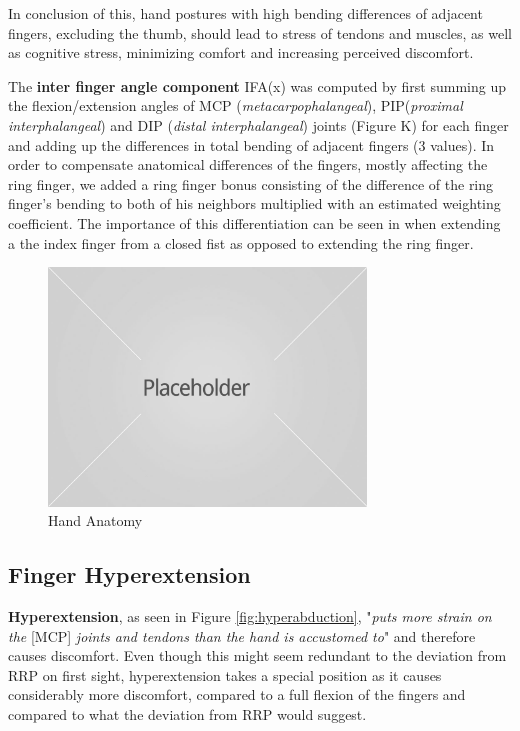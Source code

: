 \documentclass{sig-alternate-05-2015}
\begin{document}
In conclusion of this, hand postures with high bending differences of adjacent fingers, excluding the thumb, should lead to stress of tendons and muscles, as well as cognitive stress, minimizing comfort and increasing perceived discomfort.

The \textbf{inter finger angle component} IFA(x) was computed by first summing up the flexion/extension angles of MCP (\textit{metacarpophalangeal}), PIP(\textit{proximal interphalangeal}) and DIP (\textit{distal interphalangeal}) joints (Figure K) for each finger and adding up the differences in total bending of adjacent fingers (3 values). In order to compensate anatomical differences of the fingers, mostly affecting the ring finger, we added a ring finger bonus consisting of the difference of the ring finger's bending to both of his neighbors multiplied with an estimated weighting coefficient. The importance of this differentiation can be seen in when extending a the index finger from a closed fist as opposed to extending the ring finger. 

\begin{figure}
\centering
\includegraphics[width=8.45cm]{placeholder1}
\vspace{-20pt}
\caption{Hand Anatomy}
\label{fig:handAnatomy}
\vspace{-10pt}
\end{figure}

\subsection{Finger Hyperextension}

\textbf{Hyperextension}, as seen in Figure \ref{fig:hyperabduction}, "\textit{puts more strain on the }[MCP] \textit{joints and tendons than the hand is accustomed to}" \cite{laviola1999survey} and therefore causes discomfort.\cite{laviola1999survey}
Even though this might seem redundant to the deviation from RRP on first sight, hyperextension takes a special position as it causes considerably more discomfort, compared to a full flexion of the fingers and compared to what the deviation from RRP would suggest.
\end{document}

